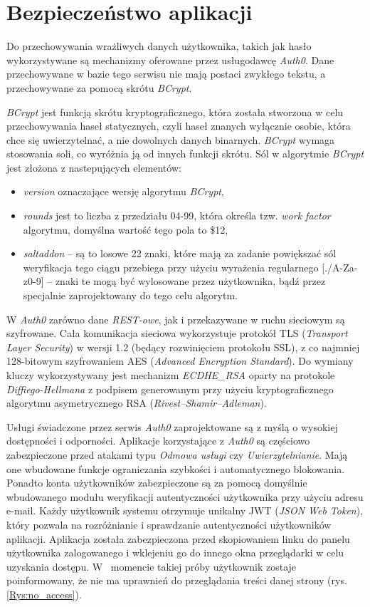 \chapter{Bezpieczeństwo aplikacji}

Do przechowywania wrażliwych danych użytkownika, takich jak hasło wykorzystywane są mechanizmy oferowane przez usługodawcę \textit{Auth0}. Dane przechowywane w bazie tego serwisu nie mają postaci zwykłego tekstu, a przechowywane za pomocą skrótu \textit{BCrypt}.

\textit{BCrypt} jest funkcją skrótu kryptograficznego, która została stworzona w celu przechowywania haseł statycznych, czyli haseł znanych wyłącznie osobie, która chce się uwierzytelnać, a nie dowolnych danych binarnych. \textit{BCrypt} wymaga stosowania soli, co wyróżnia ją od innych funkcji skrótu. Sól w algorytmie \textit{BCrypt} jest złożona z nastepujących elementów:

\begin{itemize}
	\item \textit{version} oznaczające wersję algorytmu \textit{BCrypt},
	\item \textit{rounds} jest to liczba z przedziału 04-99, która określa tzw. \textit{work factor} algorytmu, domyślna wartość tego pola to \$12,
	\item \textit{saltaddon} -- są to losowe 22 znaki, które mają za zadanie powiększać sól weryfikacja tego ciągu przebiega przy użyciu wyrażenia regularnego [./A-Za-z0-9] -- znaki te mogą być wylosowane przez użytkownika, bądź przez specjalnie zaprojektowany do tego celu algorytm. 
\end{itemize}

W \textit{Auth0} zarówno dane \textit{REST-owe}, jak i przekazywane w ruchu sieciowym są szyfrowane. Cała komunikacja sieciowa wykorzystuje protokół TLS (\textit{Transport Layer Security}) w wersji 1.2 (będący rozwinięciem protokołu SSL), z co najmniej 128-bitowym szyfrowaniem AES (\textit{Advanced Encryption Standard}). Do wymiany kluczy wykorzystywany jest mechanizm \textit{ECDHE\_RSA} oparty na protokole \textit{Diffiego-Hellmana} z podpisem generowanym przy użyciu kryptograficznego algorytmu asymetrycznego RSA (\textit{Rivest–Shamir–Adleman}). 

Usługi świadczone przez serwis \textit{Auth0} zaprojektowane są z myślą o wysokiej dostępności i odporności. Aplikacje korzystające z \textit{Auth0} są częściowo zabezpieczone przed atakami typu \textit{Odmowa usługi} czy \textit{Uwierzytelnianie}. Mają one wbudowane funkcje ograniczania szybkości i automatycznego blokowania. Ponadto konta użytkowników zabezpieczone są za pomocą domyślnie wbudowanego modułu weryfikacji autentyczności użytkownika przy użyciu adresu e-mail. Każdy użytkownik systemu otrzymuje unikalny JWT (\textit{JSON Web Token}), który pozwala na rozróżnianie i sprawdzanie autentyczności użytkowników aplikacji. Aplikacja została zabezpieczona przed skopiowaniem linku do panelu użytkownika zalogowanego i wklejeniu go do innego okna przeglądarki w celu uzyskania dostępu. W~ momencie takiej próby użytkownik zostaje poinformowany, że nie ma uprawnień do przeglądania treści danej strony (rys. \ref{Rys:no_access}). 

